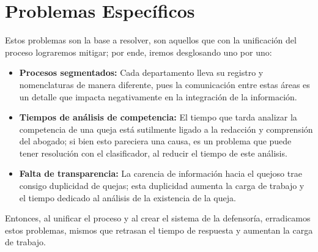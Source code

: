 \section{Problemas Específicos}
Estos problemas son la base a resolver, son aquellos que con la unificación del proceso lograremos mitigar; por ende, iremos desglosando uno por uno:

\begin{itemize}
    \item \textbf{Procesos segmentados:} Cada departamento lleva su registro y nomenclaturas de manera diferente, pues la comunicación entre estas áreas es un detalle que impacta negativamente en la integración de la información.
    
    \item \textbf{Tiempos de análisis de competencia:} El tiempo que tarda analizar la competencia de una queja está sutilmente ligado a la redacción y comprensión del abogado; si bien esto pareciera una causa, es un problema que puede tener resolución con el clasificador, al reducir el tiempo de este análisis.
    
    \item \textbf{Falta de transparencia:} La carencia de información hacia el quejoso trae consigo duplicidad de quejas; esta duplicidad aumenta la carga de trabajo y el tiempo dedicado al análisis de la existencia de la queja.
\end{itemize}

Entonces, al unificar el proceso y al crear el sistema de la defensoría, erradicamos estos problemas, mismos que retrasan el tiempo de respuesta y aumentan la carga de trabajo.